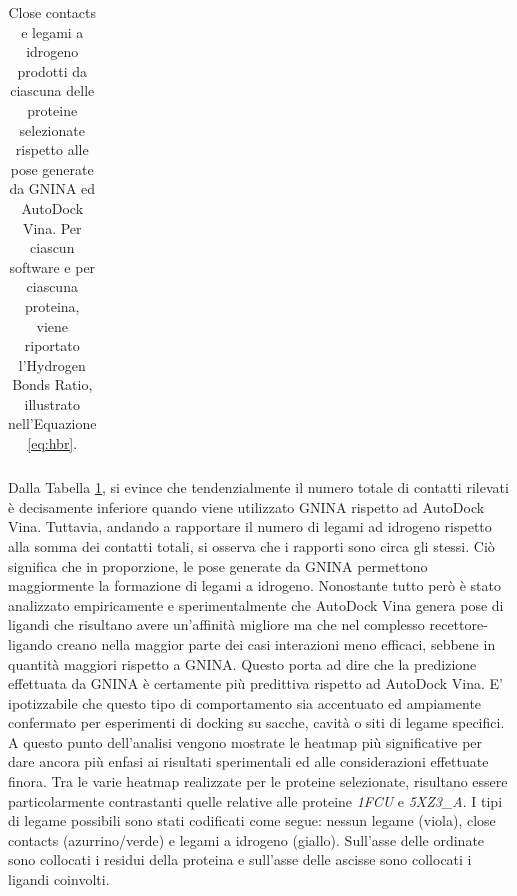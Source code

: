 \begin{table}[H]
{\begin{tabular}{ccccccc}
\end{tabular}
}
\caption[Interazioni nel complesso proteina-ligando generato da GNINA e AutoDock Vina.]{Close contacts e legami a idrogeno prodotti da ciascuna delle proteine selezionate rispetto alle pose generate da GNINA ed AutoDock Vina. Per ciascun software e per ciascuna proteina, viene riportato l'Hydrogen Bonds Ratio, illustrato nell'Equazione \ref{eq:hbr}.}
\label{contacts_table}
\end{table}

Dalla Tabella \ref{contacts_table}, si evince che tendenzialmente il numero totale di contatti rilevati è decisamente inferiore quando viene utilizzato GNINA rispetto ad AutoDock Vina. Tuttavia, andando a rapportare il numero di legami ad idrogeno rispetto alla somma dei contatti totali, si osserva che i rapporti sono circa gli stessi. Ciò significa che in proporzione, le pose generate da GNINA permettono maggiormente la formazione di legami a idrogeno.\newline  
Nonostante tutto però è stato analizzato empiricamente e sperimentalmente che AutoDock Vina genera pose di ligandi che risultano avere un'affinità migliore ma che nel complesso recettore-ligando creano nella maggior parte dei casi interazioni meno efficaci, sebbene in quantità maggiori rispetto a GNINA. Questo porta ad dire che la predizione effettuata da GNINA è certamente più predittiva rispetto ad AutoDock Vina. E' ipotizzabile che questo tipo di comportamento sia accentuato ed ampiamente confermato per esperimenti di docking su sacche, cavità o siti di legame specifici.\newline
A questo punto dell'analisi vengono mostrate le heatmap più significative per dare ancora più enfasi ai risultati sperimentali ed alle considerazioni effettuate finora. Tra le varie heatmap realizzate per le proteine selezionate, risultano essere particolarmente contrastanti quelle relative alle proteine \textit{1FCU} e \textit{5XZ3\_A}. 
I tipi di legame possibili sono stati codificati come segue: nessun legame (viola), close contacts (azurrino/verde) e legami a idrogeno (giallo). Sull'asse delle ordinate sono collocati i residui della proteina e sull'asse delle ascisse sono collocati i ligandi coinvolti.  


